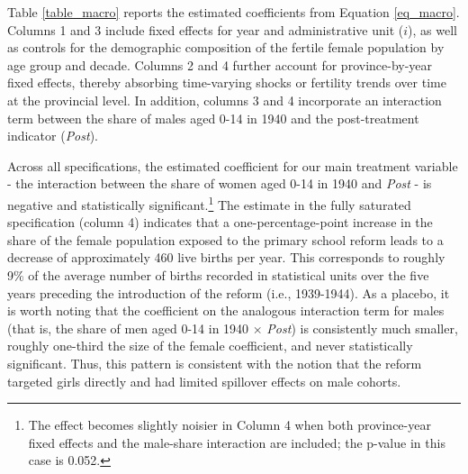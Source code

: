 \documentclass[a4paper,oneside,final,onecolumn,12pt,english]{article}
\begin{document}
Table \ref{table_macro} reports the estimated coefficients from Equation \ref{eq_macro}. Columns 1 and 3 include fixed effects for year and administrative unit ($i$), as well as controls for the demographic composition of the fertile female population by age group and decade. Columns 2 and 4 further account for province-by-year fixed effects, thereby absorbing time-varying shocks or fertility trends over time at the provincial level. In addition, columns 3 and 4 incorporate an interaction term between the share of males aged 0-14 in 1940 and the post-treatment indicator (\textit{Post}). 

Across all specifications, the estimated coefficient for our main treatment variable - the interaction between the share of women aged 0-14 in 1940 and \textit{Post} - is negative and statistically significant.\footnote{The effect becomes slightly noisier in Column 4 when both province-year fixed effects and the male-share interaction are included; the p-value in this case is 0.052.} The estimate in the fully saturated specification (column 4) indicates that a one-percentage-point increase in the share of the female population exposed to the primary school reform leads to a decrease of approximately 460 live births per year. This corresponds to roughly 9\% of the average number of births recorded in statistical units over the five years preceding the introduction of the reform (i.e., 1939-1944). As a placebo, it is worth noting that the coefficient on the analogous interaction term for males (that is, the share of men aged 0-14 in 1940 $\times$ \textit{Post}) is consistently much smaller, roughly one-third the size of the female coefficient, and never statistically significant. Thus, this pattern is consistent with the notion that the reform targeted girls directly and had limited spillover effects on male cohorts.
\end{document}
